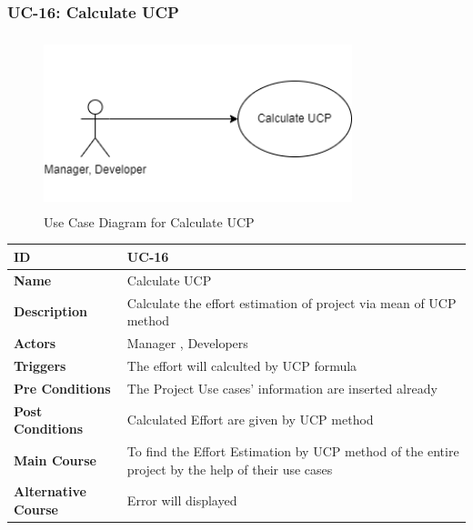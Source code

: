 \subsubsection{UC-16: Calculate UCP}
\begin{figure}[H]
    \includegraphics[height=5cm, width=0.8\textwidth]{./diagrams/Use Case/u16.png}
    \centering
    \caption{Use Case Diagram for Calculate UCP}
    \label{fig:Usecase1}
\end{figure}

\begin{center}
    \begin{tabularx}{\textwidth}{|l|X|}
        \hline
        \textbf{ID}                 & UC-16                                                                                            \\
        \hline
        \textbf{Name}               & Calculate UCP                                                                                    \\
        \hline
        \textbf{Description}        & Calculate the effort estimation of project via mean of UCP method                                \\
        \hline
        \textbf{Actors}             & Manager , Developers                                                                             \\
        \hline
        \textbf{Triggers}           & The effort will calculted by UCP formula                                                         \\
        \hline
        \textbf{Pre Conditions}     & The Project Use cases' information are inserted already                                          \\
        \hline
        \textbf{Post Conditions}    & Calculated Effort are given by UCP method                                                        \\
        \hline
        \textbf{Main Course}        & To find the Effort Estimation by UCP method of the entire project by the help of their use cases \\
        \hline
        \textbf{Alternative Course} & Error will displayed                                                                             \\
        \hline
    \end{tabularx}
\end{center}

